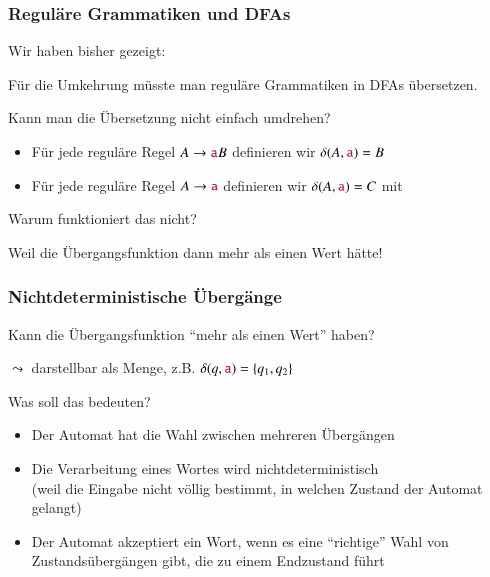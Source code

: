 \documentclass[onlymath]{beamer}
\begin{document}
\begin{frame}\frametitle{Reguläre Grammatiken und DFAs}

Wir haben bisher gezeigt:


Für die Umkehrung müsste man reguläre Grammatiken in DFAs übersetzen.
\bigskip\pause

Kann man die Übersetzung nicht einfach umdrehen?
\begin{itemize}
\item Für jede reguläre Regel $A\to\mathtt{\textcolor{purple}{a}}B$ definieren wir $\delta(A,\mathtt{\textcolor{purple}{a}})=B$
\item Für jede reguläre Regel $A\to\mathtt{\textcolor{purple}{a}}$ definieren wir $\delta(A,\mathtt{\textcolor{purple}{a}})=C$ mit 
\end{itemize}
Warum funktioniert das nicht?\pause

\alert{Weil die Übergangsfunktion dann mehr als einen Wert hätte!}\medskip


\end{frame}

\begin{frame}\frametitle{Nichtdeterministische Übergänge}

Kann die Übergangsfunktion "`mehr als einen Wert"' haben?
\medskip

$\leadsto$ darstellbar als Menge, z.B. $\delta(q,\mathtt{\textcolor{purple}{a}}) =\{q_1, q_2\}$
\bigskip

Was soll das bedeuten?
\begin{itemize}
\item Der Automat hat die Wahl zwischen mehreren Übergängen
\item Die Verarbeitung eines Wortes wird \alert{nichtdeterministisch}\\
(weil die Eingabe nicht völlig bestimmt, in welchen Zustand der Automat gelangt)
\item Der Automat akzeptiert ein Wort, wenn es eine "`richtige"' Wahl von Zustandsübergängen gibt, die zu einem Endzustand führt
\end{itemize}


\end{frame}
\end{document}
